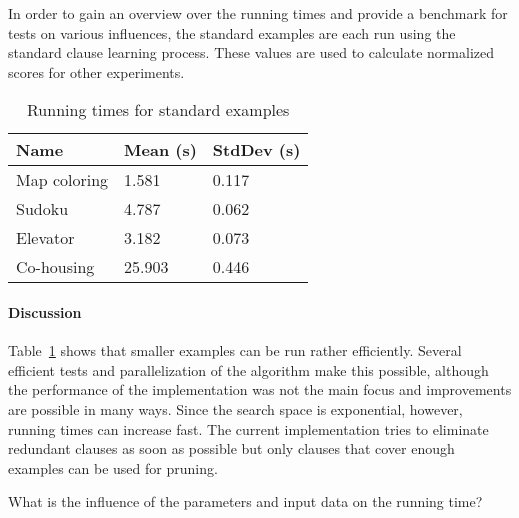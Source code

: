 \begin{experiment}
	In order to gain an overview over the running times and provide a benchmark for tests on various influences, the standard examples are each run using the standard clause learning process.
	These values are used to calculate normalized scores for other experiments.
	
	\begin{table}[!htp]
		\begin{tabularx}{\textwidth}{XXX}
			\textbf{Name}	& \textbf{Mean (s)}	& \textbf{StdDev (s)} \\
			\toprule
			Map coloring 	& 1.581				& 0.117 \\
			Sudoku 			& 4.787				& 0.062 \\
			Elevator 		& 3.182 			& 0.073 \\
			Co-housing 		& 25.903			& 0.446
		\end{tabularx}
		\label{tbl:exp_speed_standard}
		\caption{Running times for standard examples}
	\end{table}

\end{experiment}

\paragraph{Discussion}
Table~\ref{tbl:exp_speed_standard} shows that smaller examples can be run rather efficiently.
Several efficient tests and parallelization of the algorithm make this possible, although the performance of the implementation was not the main focus and improvements are possible in many ways.
Since the search space is exponential, however, running times can increase fast.
The current implementation tries to eliminate redundant clauses as soon as possible but only clauses that cover enough examples can be used for pruning.

\begin{question}
	What is the influence of the parameters and input data on the running time?
\end{question}

